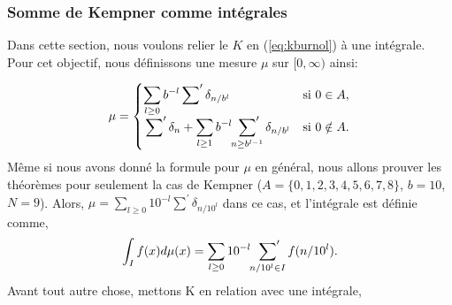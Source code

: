 \subsubsection{Somme de Kempner comme int\'egrales}
Dans cette section, nous voulons relier le $K$ en (\ref{eq:kburnol}) \`a une
int\'egrale. Pour cet objectif, nous d\'efinissons une mesure $\mu$ sur $[0,
\infty)$ ainsi:

\begin{equation}
	\mu =
	\begin{cases}
		\displaystyle
		\sum_{l\ge0} b^{-l}\sideset{}{'}\sum \delta_{n/b^{l}} & \text{si } 0\in A, \\
		\displaystyle
		\sideset{}{'}\sum \delta_{n} + \sum_{l\ge1}b^{-l} \sideset{}{'}\sum_{n\ge b^{l-1}}
		\delta_{n/b^{l}} & \text{si } 0\notin A.
	\end{cases}
	\label{eq:muburnol}
\end{equation}
M\^{e}me si nous avons donn\'e la formule pour $\mu$ en g\'en\'eral, nous allons
prouver les th\'eor\`emes pour seulement la cas de Kempner ($A = \{0, 1, 2, 3,
4, 5, 6, 7, 8\}$, $b = 10$, $N = 9$). Alors, $\mu = \sum_{l\ge0}10^{-l} \sum^{'}
\delta_{n/10^{l}}$ dans ce cas, et l'int\'egrale est d\'efinie comme,
\begin{equation}
	\int_{I} f(x)d\mu(x)= \sum_{l\ge0}10^{-l}\sideset{}{'}\sum_{n/10^{l} \in I} f(n/10^{l}).
	\label{eq:integraldefn}
\end{equation}
Avant tout autre chose, mettons K en relation avec une int\'egrale,
